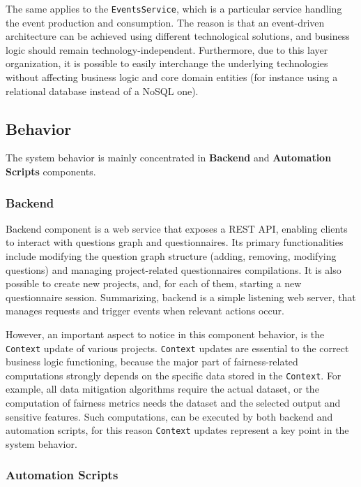 \documentclass[12pt,a4paper,openright,twoside]{book}
\begin{document}
The same applies to the \texttt{EventsService}, which is a particular service handling the event production and consumption.
%
The reason is that an event-driven architecture can be achieved using different technological solutions, and business logic should remain technology-independent.
%
Furthermore, due to this layer organization, it is possible to easily interchange the underlying technologies without affecting business logic and core domain entities (for instance using a relational database instead of a NoSQL one).


\subsection{Behavior}

The system behavior is mainly concentrated in \textbf{Backend} and \textbf{Automation Scripts} components.

\subsubsection{Backend}

Backend component is a web service that exposes a REST \ac{API}, enabling clients to interact with questions graph and questionnaires.
%
Its primary functionalities include modifying the question graph structure (adding, removing, modifying questions) and managing project-related questionnaires compilations.
%
It is also possible to create new projects, and, for each of them, starting a new questionnaire session.
%
Summarizing, backend is a simple listening web server, that manages requests and trigger events when relevant actions occur.

However, an important aspect to notice in this component behavior, is the \texttt{Context} update of various projects.
%
\texttt{Context} updates are essential to the correct business logic functioning, because the major part of fairness-related computations strongly depends on the specific data stored in the \texttt{Context}.
%
For example, all data mitigation algorithms require the actual dataset, or the computation of fairness metrics needs the dataset and the selected output and sensitive features.
%
Such computations, can be executed by both backend and automation scripts, for this reason \texttt{Context} updates represent a key point in the system behavior.

\subsubsection{Automation Scripts}
\end{document}
